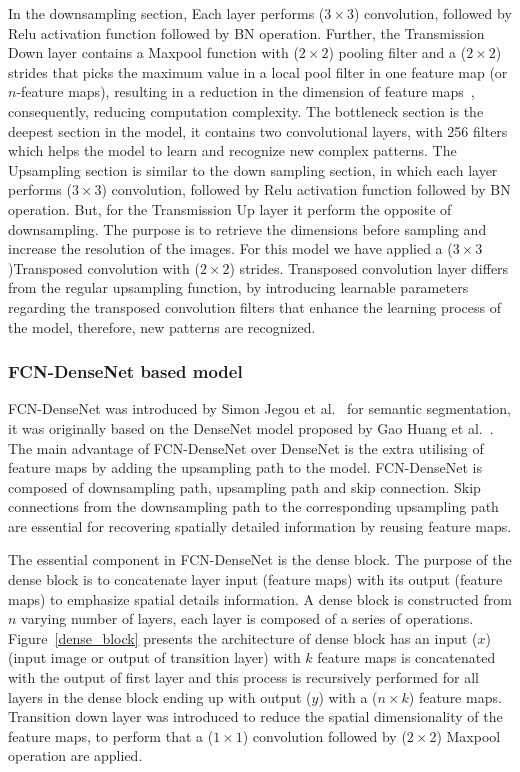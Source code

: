 \documentclass[preprint,9pt]{elsarticle}
\begin{document}
In the downsampling section,
Each layer performs (\(3\times3\)) convolution, followed by Relu activation function followed by BN operation.
Further, the Transmission Down layer contains a Maxpool function with (\(2\times2\)) pooling filter and a (\(2\times2\)) strides that picks the maximum value in a local pool filter in one feature map (or \(n\)-feature maps), resulting in a reduction in the dimension of feature maps~\cite{Lecun2015}, consequently, reducing computation complexity.
The bottleneck section is the deepest section in the model, it contains two convolutional layers, with 256 filters which helps the model to learn and recognize new complex patterns.
The Upsampling section is similar to the down sampling section, in which each layer  performs (\(3\times3\)) convolution, followed by Relu activation function followed by BN operation. But, for the Transmission Up layer it perform the opposite of downsampling.
The purpose is to retrieve the dimensions before sampling and increase the resolution of the images. 
For this model we have applied a (\(3\times3\))Transposed convolution with (\(2\times2\)) strides.
Transposed convolution layer differs from the regular upsampling function, by introducing learnable parameters regarding the transposed convolution filters that enhance the learning process of the model, therefore, new patterns are recognized. 


\subsubsection{FCN-DenseNet based model}
FCN-DenseNet was introduced by Simon Jegou et al.~\cite{Jegou} for semantic segmentation, it was originally based on the DenseNet model proposed by Gao Huang et al.~\cite{Huang}. 
The main advantage of FCN-DenseNet over DenseNet is the extra utilising of feature maps by adding the upsampling path to the model.
FCN-DenseNet is composed of downsampling path, upsampling path and skip connection.
Skip connections from the downsampling path to the corresponding upsampling path are essential for recovering spatially detailed information by reusing feature maps.
 
The essential component in FCN-DenseNet is the dense block.
The purpose of the dense block is to concatenate layer input (feature maps) with its output (feature maps) to emphasize spatial details information.
A dense block is constructed from \(n\) varying number of layers, each layer is composed of a series of operations.
Figure~\ref{dense_block} presents the architecture of dense block has an input (\(x\)) (input image or output of transition layer) with \(k\) feature maps is concatenated with the output of first layer and this process is recursively performed for all layers in the dense block ending up with output (\(y\)) with a (\(n\times k\)) feature maps. 
Transition down layer was introduced to reduce the spatial dimensionality of the feature maps, to perform that a (\(1\times 1\))  convolution followed by (\(2\times2\)) Maxpool operation are applied. 
\end{document}
